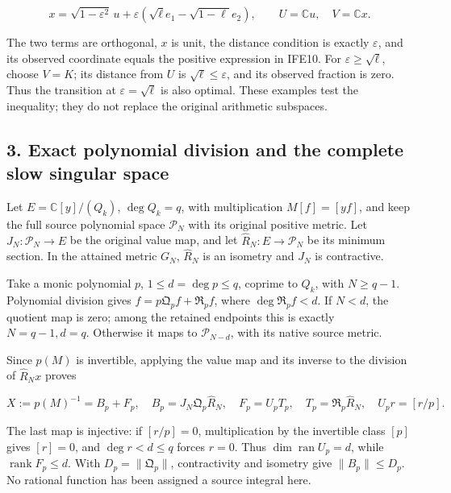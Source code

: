 \documentclass[11pt]{article}
\begin{document}
\[
x=\sqrt{1-\varepsilon^2}\,u
+\varepsilon(\sqrt\ell e_1-\sqrt{1-\ell}e_2),
\qquad U=\mathbb Cu,\quad V=\mathbb Cx.
\tag{IFE11}
\]

The two terms are orthogonal, \(x\) is unit, the distance condition is exactly \(\varepsilon\), and its observed coordinate equals the positive expression in IFE10. For \(\varepsilon\ge\sqrt\ell\), choose \(V=K\); its distance from \(U\) is \(\sqrt\ell\le\varepsilon\), and its observed fraction is zero. Thus the transition at \(\varepsilon=\sqrt\ell\) is also optimal. These examples test the inequality; they do not replace the original arithmetic subspaces.

\subsection{3. Exact polynomial division and the complete slow singular space}\label{exact-polynomial-division-and-the-complete-slow-singular-space}

Let \(E=\mathbb C[y]/(Q_k)\), \(\deg Q_k=q\), with multiplication \(M[f]=[yf]\), and keep the full source polynomial space \(\mathcal P_N\) with its original positive metric. Let \(J_N:\mathcal P_N\to E\) be the original value map, and let \(\widehat R_N:E\to\mathcal P_N\) be its minimum section. In the attained metric \(G_N\), \(\widehat R_N\) is an isometry and \(J_N\) is contractive.

Take a monic polynomial \(p\), \(1\le d=\deg p\le q\), coprime to \(Q_k\), with \(N\ge q-1\). Polynomial division gives \(f=p\mathfrak Q_pf+\mathfrak R_pf\), where \(\deg\mathfrak R_pf<d\). If \(N<d\), the quotient map is zero; among the retained endpoints this is exactly \(N=q-1,d=q\). Otherwise it maps to \(\mathcal P_{N-d}\), with its native source metric.

Since \(p(M)\) is invertible, applying the value map and its inverse to the division of \(\widehat R_Nx\) proves

\[
X:=p(M)^{-1}=B_p+F_p,
\quad B_p=J_N\mathfrak Q_p\widehat R_N,
\quad F_p=U_pT_p,
\quad T_p=\mathfrak R_p\widehat R_N,
\quad U_pr=[r/p].
\tag{IFE12}
\]

The last map is injective: if \([r/p]=0\), multiplication by the invertible class \([p]\) gives \([r]=0\), and \(\deg r<d\le q\) forces \(r=0\). Thus \(\dim\operatorname{ran}U_p=d\), while \(\operatorname{rank}F_p\le d\). With \(D_p=\|\mathfrak Q_p\|\), contractivity and isometry give \(\|B_p\|\le D_p\). No rational function has been assigned a source integral here.
\end{document}
